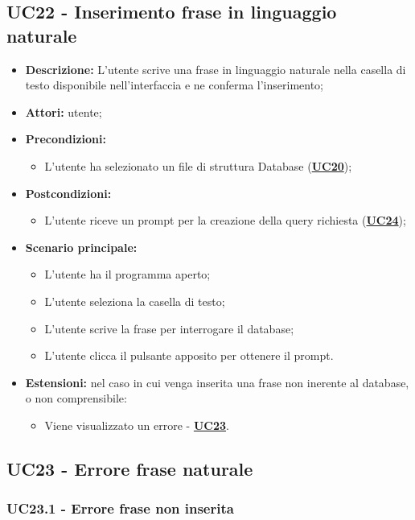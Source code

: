 \documentclass[5pt]{article}
\begin{document}
\subsection{UC22 - Inserimento frase in linguaggio naturale}
\label{sec:UC22}
\begin{itemize}
	\item \textbf{Descrizione:} L’utente scrive una frase in linguaggio naturale nella casella di testo disponibile nell’interfaccia e ne conferma l’inserimento;
	\item \textbf{Attori:} utente;
	\item \textbf{Precondizioni:} 
	\begin{itemize}
		\item L’utente ha selezionato un file di struttura Database (\hyperref[sec:UC20]{\textbf{UC20}});
	\end{itemize}
	\item \textbf{Postcondizioni:} 
	\begin{itemize}
		\item L’utente riceve un prompt per la creazione della query richiesta (\hyperref[sec:UC24]{\textbf{UC24}});
	\end{itemize}
	\item \textbf{Scenario principale:} 
	\begin{itemize}
		\item L’utente ha il programma aperto;
		\item L’utente seleziona la casella di testo;
		\item L’utente scrive la frase per interrogare il database;
		\item L’utente clicca il pulsante apposito per ottenere il prompt.
	\end{itemize}
	\item \textbf{Estensioni:} nel caso in cui venga inserita una frase non inerente al database, o non comprensibile:
	\begin{itemize}
		\item Viene visualizzato un errore - \hyperref[sec:UC23]{\textbf{UC23}}.
	\end{itemize}
\end{itemize}

\subsection{UC23 - Errore frase naturale}
\label{sec:UC23}

\subsubsection{UC23.1 - Errore frase non inserita}
\label{sec:UC23.1}
\end{document}

